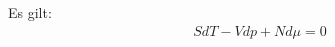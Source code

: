 
\begin{theorem}
    Es gilt:
    \begin{align*}
        S dT - V dp + N d \mu = 0
    \end{align*}
\end{theorem}



